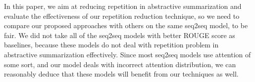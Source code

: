 In this paper, we aim at reducing repetition in abstractive summarization
and evaluate the
effectiveness of our repetition reduction technique, so we need to compare our proposed
approaches with others on the same seq2seq model, to be fair. 
We did not take all of the seq2seq models with better ROUGE score as baselines, because
these models do not deal with repetition problem in abstractive
summarization effectively. 
Since most seq2seq models use attention of some sort, and our model deals
with incorrect attention distribution, we can reasonably deduce that these models
will benefit from our techniques as well. 


